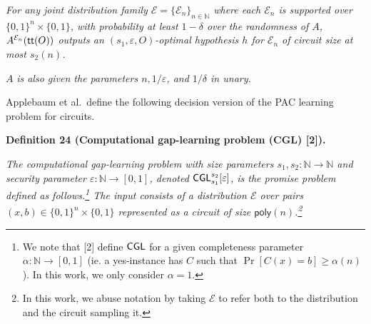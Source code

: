 \documentclass[10pt,a4paper]{article}
\begin{document}
\emph{For any joint distribution family $\mathcal{E}=\{\mathcal{E}_{n}\}_{n\in\mathbb{N}}$ where each $\mathcal{E}_{n}$ is supported over $\{0,1\}^{n}\times\{0,1\}$, with probability at least $1-\delta$ over the randomness of $A$, $A^{\mathcal{E}_{n}}({\sf tt}(O))$ outputs an $(s_{1},\varepsilon,O)$-optimal hypothesis $h$ for $\mathcal{E}_{n}$ of circuit size at most $s_{2}(n)$.}\par




$A$\emph{ is also given the parameters $n,1/\varepsilon$, and $1/\delta$ in unary.}\par






Applebaum et al. define the following decision version of the PAC learning problem for circuits.\par





\par\medskip\noindent\textbf{
\textbf{Definition 24}\textbf{ }(Computational gap-learning problem (CGL) [2])\textbf{.}
}\par



\emph{The computational gap-learning problem with size parameters $s_{1},s_{2}:\mathbb{N}\to\mathbb{N}$ and security parameter $\varepsilon:\mathbb{N}\to[0,1]$, denoted ${\sf CGL}_{s_{1}}^{s_{2}}[\varepsilon]$, is the promise problem defined as follows.\footnote{We note that [2] define ${\sf CGL}$ for a given completeness parameter $\alpha:\mathbb{N}\to[0,1]$ (ie. a yes-instance has $C$ such that $\Pr[C(x)=b]\geq\alpha(n)$). In this work, we only consider $\alpha=1$.} The input consists of a distribution $\mathcal{E}$ over pairs $(x,b)\in\{0,1\}^{n}\times\{0,1\}$ represented as a circuit of size ${\mathsf{poly}}(n)$.\footnote{In this work, we abuse notation by taking $\mathcal{E}$ to refer both to the distribution and the circuit sampling it.}}\par
\end{document}
